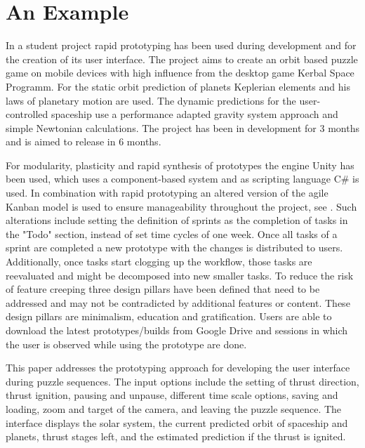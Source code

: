 \documentclass[runningheads]{llncs}
\begin{document}
\section{An Example}
In a student project\cite{ref_planeter} rapid prototyping has been used during development and for the creation of its user interface. 
The project aims to create an orbit based puzzle game on mobile devices with high influence from the desktop game 
Kerbal Space Programm. For the static orbit prediction of planets Keplerian elements and his laws of planetary motion
are used. The dynamic predictions for the user-controlled spaceship use a performance adapted gravity system approach
and simple Newtonian calculations. The project has been in development for 3 months and is aimed to release in 6 months.

For modularity, plasticity and rapid synthesis of prototypes the engine Unity has been used, which uses a component-based system 
and as scripting language C\# is used. In combination with rapid prototyping an altered version of the agile Kanban\cite{ref_kanban} model 
is used to ensure manageability throughout the project, see . Such alterations include setting the definition of sprints 
as the completion of tasks in the "Todo" section, instead of set time cycles of one week. 
Once all tasks of a sprint are completed a new prototype with the changes is distributed to users.
Additionally, once tasks start clogging up the workflow, those tasks are reevaluated and might be decomposed into new smaller tasks.
To reduce the risk of feature creeping three design pillars have been defined that need to be addressed and may not be contradicted by additional features or content. These design pillars are minimalism, education and gratification. Users are able to 
download the latest prototypes/builds from Google Drive\cite{ref_planeterProto} and sessions in which the user is observed while using the prototype are done.

This paper addresses the prototyping approach for developing the user interface during puzzle sequences.
The input options include the setting of thrust direction, thrust ignition, pausing and unpause, different 
time scale options, saving and loading, zoom and target of the camera, and leaving the puzzle sequence.
The interface displays the solar system, the current predicted orbit of spaceship and planets, thrust stages left, and the 
estimated prediction if the thrust is ignited.
\end{document}
